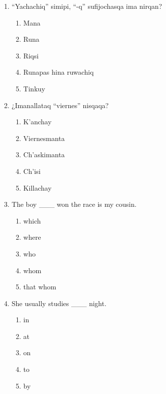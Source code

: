 \begin{enumerate}
	\begin{enumerate}[label=\alph*)]
		\item Encuadrado
		\item Paralelo
		\item Analizante
		\item alternado-centrado
		\item sintetizante
	\end{enumerate}
	
	\item “Yachachiq” simipi, “-q” sufijochasqa ima nirqan?
	\begin{enumerate}[label=\alph*)]
		\item Mana
		\item Runa
		\item Riqsi
		\item Runapas hina ruwachiq
		\item Tinkuy
	\end{enumerate}
	
	\item ¿Imanallataq “viernes” nisqaqa?
	\begin{enumerate}[label=\alph*)]
		\item K’anchay
		\item Viernesmanta
		\item Ch’askimanta
		\item Ch’isi
		\item Killachay
	\end{enumerate}
	

	
	\item The boy \_\_\_ won the race is my cousin.
	\begin{enumerate}[label=\alph*)]
		\item which
		\item where
		\item who
		\item whom
		\item that whom
	\end{enumerate}
	
	\item She usually studies \_\_\_ night.
	\begin{enumerate}[label=\alph*)]
		\item in
		\item at
		\item on
		\item to
		\item by
	\end{enumerate}
	
	\end{enumerate}




